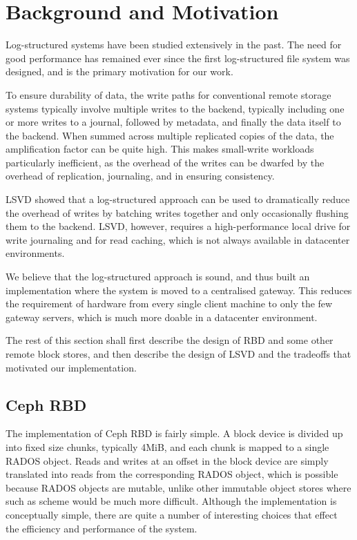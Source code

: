 \section{Background and Motivation}

Log-structured systems have been studied extensively in the past. The need for
good performance has remained ever since the first log-structured file system
was designed, and is the primary motivation for our work.

To ensure durability of data, the write paths for conventional remote storage
systems typically involve multiple writes to the backend, typically including
one or more writes to a journal, followed by metadata, and finally the data
itself to the backend. When summed across multiple replicated copies of the
data, the amplification factor can be quite high. This makes small-write
workloads particularly inefficient, as the overhead of the writes can be
dwarfed by the overhead of replication, journaling, and in ensuring consistency.

LSVD showed that a log-structured approach can be used to dramatically reduce
the overhead of writes by batching writes together and only occasionally
flushing them to the backend. LSVD, however, requires a high-performance local
drive for write journaling and for read caching, which is not always available
in datacenter environments.

We believe that the log-structured approach is sound, and thus built an
implementation where the system is moved to a centralised gateway. This reduces
the requirement of hardware from every single client machine to only the few
gateway servers, which is much more doable in a datacenter environment.

The rest of this section shall first describe the design of RBD and some other
remote block stores, and then describe the design of LSVD and the tradeoffs
that motivated our implementation.

\subsection{Ceph RBD}

The implementation of Ceph RBD is fairly simple. A block device is divided up
into fixed size chunks, typically 4MiB, and each chunk is mapped to a single
RADOS object. Reads and writes at an offset in the block device are simply
translated into reads from the corresponding RADOS object, which is possible
because RADOS objects are mutable, unlike other immutable object stores where
such as scheme would be much more difficult. Although the implementation is
conceptually simple, there are quite a number of interesting choices that effect
the efficiency and performance of the system.

